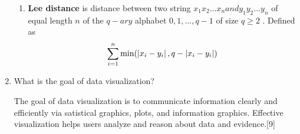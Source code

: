 \documentclass[12pt]{article}%
\begin{document}
\begin{enumerate}
\begin{enumerate}
		\item \textbf{Lee distance} is distance between two string $x_1x_2...x_n and y_1y_2...y_n$ of equal length $n$ of the $q-ary$ alphabet ${0,1,...,q-1}$ of size $q\geq 2$ . Defined as 
		\begin{equation}
			\sum_{i=1}^{n} \textup{min}(\left | x_i - y_i \right |, q - \left | x_i - y_i \right |)
		\end{equation}
	\end{enumerate}

	\item What is the goal of data visualization?
	\par The goal of data visualization is to communicate information clearly and efficiently via satistical graphics, plots, and information graphics. Effective visualization helps users analyze and reason about data and evidence.[9]
\end{enumerate}
\end{document}
